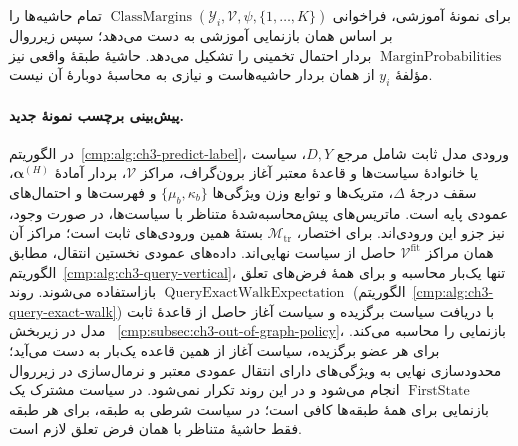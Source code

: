 برای نمونهٔ آموزشی، فراخوانی
$\operatorname{ClassMargins}(\mathscr Y_i,\mathcal V,\psi,\{1,\ldots,K\})$
تمام حاشیه‌ها را بر اساس همان بازنمایی آموزشی به دست
می‌دهد؛ سپس زیرروال $\operatorname{MarginProbabilities}$
بردار احتمال تخمینی را تشکیل می‌دهد. حاشیهٔ طبقهٔ
واقعی نیز مؤلفهٔ $y_i$ از همان بردار حاشیه‌هاست و
نیازی به محاسبهٔ دوبارهٔ آن نیست.

\paragraph{پیش‌بینی برچسب نمونهٔ جدید.}
در الگوریتم~\ref{cmp:alg:ch3-predict-label}، ورودی
مدل ثابت شامل مرجع $D,Y$، سیاست یا خانوادهٔ
سیاست‌ها و قاعدهٔ معتبر آغاز برون‌گراف، مراکز
$\mathcal V$، بردار آمادهٔ $\boldsymbol\alpha^{(H)}$،
سقف درجهٔ $\Delta$، متریک‌ها و توابع وزن ویژگی‌ها
$\{\mu_b,\kappa_b\}$ و فهرست‌ها و احتمال‌های
عمودی پایه است. ماتریس‌های پیش‌محاسبه‌شدهٔ متناظر با
سیاست‌ها، در صورت وجود، نیز جزو این ورودی‌اند.
برای اختصار، $\mathcal M_{\mathrm{tr}}$ بستهٔ
همین ورودی‌های ثابت است؛ مراکز آن همان مراکز
$\mathcal V^{\mathrm{fit}}$ حاصل از سیاست نهایی‌اند. داده‌های عمودی نخستین
انتقال، مطابق الگوریتم~\ref{cmp:alg:ch3-query-vertical}،
تنها یک‌بار محاسبه و برای همهٔ فرض‌های تعلق
بازاستفاده می‌شوند. روند
$\operatorname{QueryExactWalkExpectation}$
(الگوریتم~\ref{cmp:alg:ch3-query-exact-walk})
با دریافت سیاست برگزیده و سیاست آغاز حاصل از
قاعدهٔ ثابت مدل در زیربخش~
\ref{cmp:subsec:ch3-out-of-graph-policy}،
بازنمایی را محاسبه می‌کند. برای هر عضو برگزیده،
سیاست آغاز از همین قاعده یک‌بار به دست می‌آید؛
محدودسازی نهایی به ویژگی‌های دارای انتقال عمودی
معتبر و نرمال‌سازی در زیرروال
$\operatorname{FirstState}$ انجام می‌شود و
در این روند تکرار نمی‌شود. در سیاست مشترک یک
بازنمایی برای همهٔ طبقه‌ها کافی است؛ در سیاست
شرطی به طبقه، برای هر طبقه فقط حاشیهٔ متناظر
با همان فرض تعلق لازم است.

